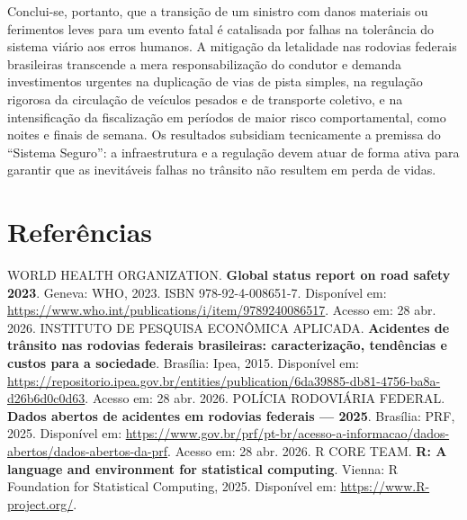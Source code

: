 \documentclass[
  brazilian,
  12pt,
]{article}
\begin{document}
Conclui-se, portanto, que a transição de um sinistro com danos materiais
ou ferimentos leves para um evento fatal é catalisada por falhas na
tolerância do sistema viário aos erros humanos. A mitigação da
letalidade nas rodovias federais brasileiras transcende a mera
responsabilização do condutor e demanda investimentos urgentes na
duplicação de vias de pista simples, na regulação rigorosa da circulação
de veículos pesados e de transporte coletivo, e na intensificação da
fiscalização em períodos de maior risco comportamental, como noites e
finais de semana. Os resultados subsidiam tecnicamente a premissa do
``Sistema Seguro'': a infraestrutura e a regulação devem atuar de forma
ativa para garantir que as inevitáveis falhas no trânsito não resultem
em perda de vidas.

\newpage

\section{Referências}\label{referuxeancias}

WORLD HEALTH ORGANIZATION. \textbf{Global status report on road safety
2023}. Geneva: WHO, 2023. ISBN 978-92-4-008651-7. Disponível em:
\url{https://www.who.int/publications/i/item/9789240086517}. Acesso em:
28 abr. 2026. \newline INSTITUTO DE PESQUISA ECONÔMICA APLICADA.
\textbf{Acidentes de trânsito nas rodovias federais brasileiras:
caracterização, tendências e custos para a sociedade}. Brasília: Ipea,
2015. Disponível em:
\url{https://repositorio.ipea.gov.br/entities/publication/6da39885-db81-4756-ba8a-d26b6d0c0d63}.
Acesso em: 28 abr. 2026. \newline POLÍCIA RODOVIÁRIA FEDERAL.
\textbf{Dados abertos de acidentes em rodovias federais --- 2025}.
Brasília: PRF, 2025. Disponível em:
\url{https://www.gov.br/prf/pt-br/acesso-a-informacao/dados-abertos/dados-abertos-da-prf}.
Acesso em: 28 abr. 2026. \newline R CORE TEAM. \textbf{R: A language and
environment for statistical computing}. Vienna: R Foundation for
Statistical Computing, 2025. Disponível em:
\url{https://www.R-project.org/}.
\end{document}
